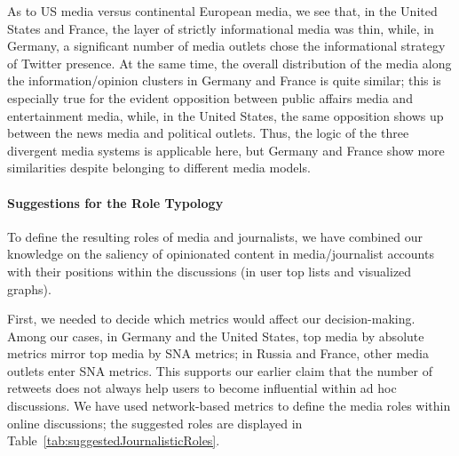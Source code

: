 As to US media versus continental European media, we see that, in the United States and France, the layer of strictly informational media was thin, while, in Germany, a significant number of media outlets chose the informational strategy of Twitter presence. At the same time, the overall distribution of the media along the information/opinion clusters in Germany and France is quite similar; this is especially true for the evident opposition between public affairs media and entertainment media, while, in the United States, the same opposition shows up between the news media and political outlets. Thus, the logic of the three divergent media systems \cite{HallinMancini} is applicable here, but Germany and France show more similarities despite belonging to different media models.

\paragraph{Suggestions for the Role Typology}
To define the resulting roles of media and journalists, we have combined our knowledge on the saliency of opinionated content in media/journalist accounts with their positions within the discussions (in user top lists and visualized graphs).

First, we needed to decide which metrics would affect our decision-making. Among our cases, in Germany and the United States, top media by absolute metrics mirror top media by SNA metrics; in Russia and France, other media outlets enter SNA metrics. This supports our earlier claim \cite{BodrunovaLitvinenkoBlekanov2016,BodrunovaLitvinenkoBlekanov2017} that the number of retweets does not always help users to become influential within ad hoc discussions. We have used network-based metrics to define the media roles within online discussions; the suggested roles are displayed in Table~\cref{tab:suggestedJournalisticRoles}.

